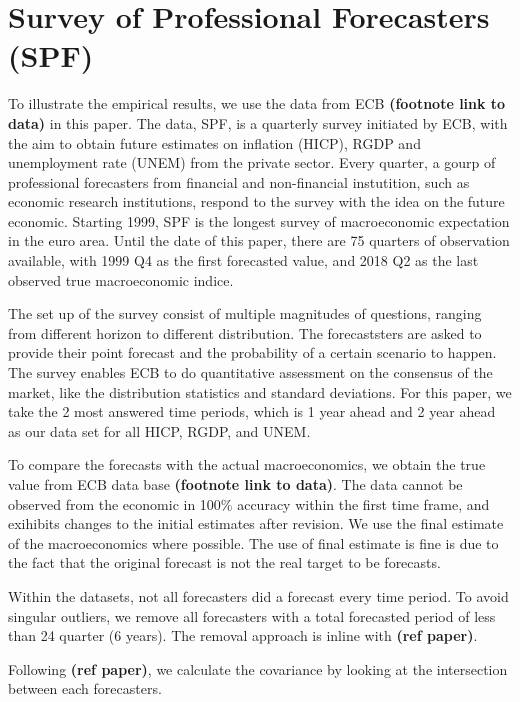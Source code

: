 \documentclass[]{article}
\begin{document}
\hypertarget{survey-of-professional-forecasters-spf}{%
\section{Survey of Professional Forecasters
(SPF)}\label{survey-of-professional-forecasters-spf}}

To illustrate the empirical results, we use the data from ECB
\textbf{(footnote link to data)} in this paper. The data, SPF, is a
quarterly survey initiated by ECB, with the aim to obtain future
estimates on inflation (HICP), RGDP and unemployment rate (UNEM) from
the private sector. Every quarter, a gourp of professional forecasters
from financial and non-financial instutition, such as economic research
institutions, respond to the survey with the idea on the future
economic. Starting 1999, SPF is the longest survey of macroeconomic
expectation in the euro area. Until the date of this paper, there are 75
quarters of observation available, with 1999 Q4 as the first forecasted
value, and 2018 Q2 as the last observed true macroeconomic indice.

The set up of the survey consist of multiple magnitudes of questions,
ranging from different horizon to different distribution. The
forecaststers are asked to provide their point forecast and the
probability of a certain scenario to happen. The survey enables ECB to
do quantitative assessment on the consensus of the market, like the
distribution statistics and standard deviations. For this paper, we take
the 2 most answered time periods, which is 1 year ahead and 2 year ahead
as our data set for all HICP, RGDP, and UNEM.

To compare the forecasts with the actual macroeconomics, we obtain the
true value from ECB data base \textbf{(footnote link to data)}. The data
cannot be observed from the economic in 100\% accuracy within the first
time frame, and exihibits changes to the initial estimates after
revision. We use the final estimate of the macroeconomics where
possible. The use of final estimate is fine is due to the fact that the
original forecast is not the real target to be forecasts.

Within the datasets, not all forecasters did a forecast every time
period. To avoid singular outliers, we remove all forecasters with a
total forecasted period of less than 24 quarter (6 years). The removal
approach is inline with \textbf{(ref paper)}.

Following \textbf{(ref paper)}, we calculate the covariance by looking
at the intersection between each forecasters.
\end{document}
